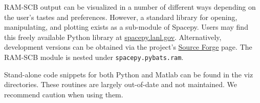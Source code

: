 RAM-SCB output can be visualized in a number of different ways depending on
the user's tastes and preferences.  However, a standard library for opening,
manipulating, and plotting exists as a sub-module of Spacepy.  Users may
find this freely available Python library at
\href{http://spacepy.lanl.gov/}{spacepy.lanl.gov}.  Alternatively,
development versions can be obtained via the project's
\href{http://sourceforge.net/projects/spacepy/}{Source Forge} page.  The
RAM-SCB module is nested under {\tt spacepy.pybats.ram}.

Stand-alone code snippets for both Python and Matlab can be found in the
{viz} directories.  These routines are largely out-of-date and not maintained.
We recommend caution when using them.

